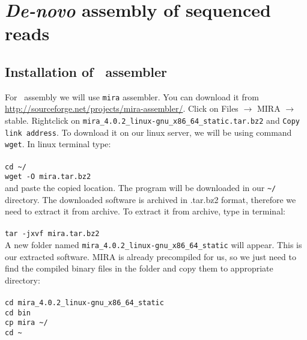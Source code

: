 \section{\textit{De-novo} assembly of sequenced reads}
\subsection{Installation of \denovo~assembler}
For \denovo~assembly we will use \texttt{mira} assembler.
You can download it from \url{http://sourceforge.net/projects/mira-assembler/}.
Click on Files $\rightarrow$ MIRA $\rightarrow$ stable. Rightclick on \texttt{mira\_4.0.2\_linux-gnu\_x86\_64\_static.tar.bz2}
and \texttt{Copy link address}.
To download it on our linux server, we will be using command \texttt{wget}. In linux terminal type: \\~\\
\texttt{cd \textasciitilde/\progDir} \\
\texttt{wget -O mira.tar.bz2} \\

and paste the copied location.
The program will be downloaded in our \texttt{\textasciitilde/\progDir} directory. 
The downloaded software is archived in .tar.bz2 format, therefore we need to extract it from archive.
To extract it from archive, type in terminal:\\~\\
\texttt{tar -jxvf mira.tar.bz2}\\

A new folder named \texttt{mira\_4.0.2\_linux-gnu\_x86\_64\_static} will appear.
This is our extracted software.
MIRA is already precompiled for us, so we just need
to find the compiled binary files in the folder and copy them to appropriate directory: \\~\\
\texttt{cd mira\_4.0.2\_linux-gnu\_x86\_64\_static} \\
\texttt{cd bin} \\
\texttt{cp mira \textasciitilde/\binDir} \\
\texttt{cd \textasciitilde} \\

